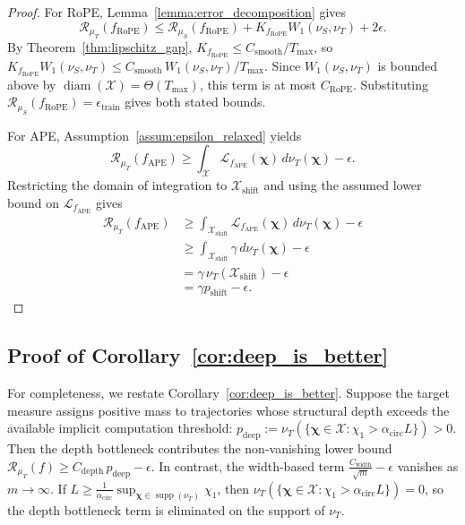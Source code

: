 \begin{proof}
For RoPE, Lemma~\ref{lemma:error_decomposition} gives
\begin{equation}
\mathcal{R}_{\mu_T}(f_{\mathrm{RoPE}})
\le
\mathcal{R}_{\mu_S}(f_{\mathrm{RoPE}})
+
K_{f_{\mathrm{RoPE}}}W_1(\nu_S,\nu_T)
+
2\epsilon.
\end{equation}
By Theorem~\ref{thm:lipschitz_gap}, $K_{f_{\mathrm{RoPE}}}\le C_{\mathrm{smooth}}/T_{\max}$, so $K_{f_{\mathrm{RoPE}}}W_1(\nu_S,\nu_T)\le C_{\mathrm{smooth}}\,W_1(\nu_S,\nu_T)/T_{\max}$. Since $W_1(\nu_S,\nu_T)$ is bounded above by $\operatorname{diam}(\mathcal{X})=\Theta(T_{\max})$, this term is at most $C_{\mathrm{RoPE}}$. Substituting \(\mathcal{R}_{\mu_S}(f_{\mathrm{RoPE}})=\epsilon_{\mathrm{train}}\) gives both stated bounds.

For APE, Assumption~\ref{assum:epsilon_relaxed} yields
\begin{equation}
\mathcal{R}_{\mu_T}(f_{\mathrm{APE}})
\ge
\int_{\mathcal{X}}
\mathcal{L}_{f_{\mathrm{APE}}}(\boldsymbol{\chi})
\,d\nu_T(\boldsymbol{\chi})
-\epsilon.
\end{equation}
Restricting the domain of integration to $\mathcal{X}_{\mathrm{shift}}$ and using the assumed lower bound on $\mathcal{L}_{f_{\mathrm{APE}}}$ gives
\begin{align}
\mathcal{R}_{\mu_T}(f_{\mathrm{APE}})
&\ge
\int_{\mathcal{X}_{\mathrm{shift}}}
\mathcal{L}_{f_{\mathrm{APE}}}(\boldsymbol{\chi})
\,d\nu_T(\boldsymbol{\chi})
-\epsilon \\
&\ge
\int_{\mathcal{X}_{\mathrm{shift}}}
\gamma\,d\nu_T(\boldsymbol{\chi})
-\epsilon \\
&=
\gamma\,\nu_T(\mathcal{X}_{\mathrm{shift}})-\epsilon \\
&=
\gamma p_{\mathrm{shift}}-\epsilon.
\end{align}
\end{proof}

\subsection{Proof of Corollary~\ref{cor:deep_is_better}}
\label{app:proof-cor-deep-better}

For completeness, we restate Corollary~\ref{cor:deep_is_better}.
Suppose the target measure assigns positive mass to trajectories whose structural depth exceeds the available implicit computation threshold: $p_{\mathrm{deep}} := \nu_T\!( \{\boldsymbol{\chi}\in\mathcal{X}:\chi_1>\alpha_{\mathrm{circ}}L\} ) > 0$. Then the depth bottleneck contributes the non-vanishing lower bound $\mathcal{R}_{\mu_T}(f)\ge C_{\mathrm{depth}}\,p_{\mathrm{deep}}-\epsilon$. In contrast, the width-based term $\frac{C_{\mathrm{width}}}{\sqrt m}-\epsilon$ vanishes as $m\to\infty$. If $L \ge \frac{1}{\alpha_{\mathrm{circ}}} \sup_{\boldsymbol{\chi}\in\operatorname{supp}(\nu_T)} \chi_1$, then $\nu_T\!( \{\boldsymbol{\chi}\in\mathcal{X}:\chi_1>\alpha_{\mathrm{circ}}L\} ) = 0$, so the depth bottleneck term is eliminated on the support of $\nu_T$.

